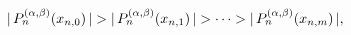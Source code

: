 $|\mathop{P^{(\alpha,\beta)}_{n}\/}\nolimits\!\left(x_{n,0}\right)|>|\mathop{P^%
{(\alpha,\beta)}_{n}\/}\nolimits\!\left(x_{n,1}\right)|>\cdots>|\mathop{P^{(%
\alpha,\beta)}_{n}\/}\nolimits\!\left(x_{n,m}\right)|,$
